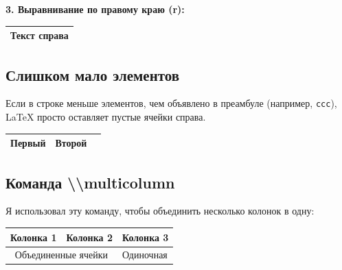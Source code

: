 \documentclass[a4paper, 12pt]{article}
\begin{document}
	\vspace{0.5cm}
	
	\textbf{3. Выравнивание по правому краю (r):} \\
	\begin{tabular}{|@{\hspace{3cm}}r|}
		\hline
		Текст справа \\
		\hline
	\end{tabular}
	
	\subsection{Слишком мало элементов}
	Если в строке меньше элементов, чем объявлено в преамбуле (например, \texttt{ccc}), LaTeX просто оставляет пустые ячейки справа.
	\begin{center}
		\begin{tabular}{|c|c|c|}
			\hline
			Первый & Второй & \\ %
			\hline
		\end{tabular}
	\end{center}
	
	
	\subsection{Команда \textbackslash\textbackslash multicolumn}
	Я использовал эту команду, чтобы объединить несколько колонок в одну:
	\begin{center}
		\begin{tabular}{lll}
			\toprule
			Колонка 1 & Колонка 2 & Колонка 3 \\
			\midrule
			\multicolumn{2}{c}{Объединенные ячейки} & Одиночная \\
			\bottomrule
		\end{tabular}
	\end{center}
	
\end{document}
